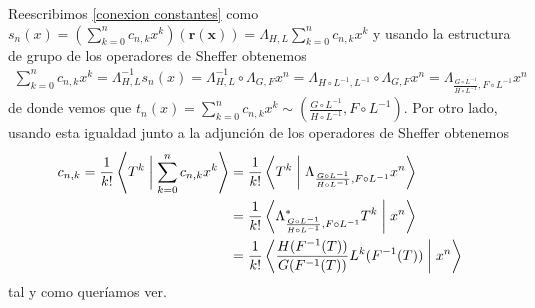 \begin{demo}
    Reescribimos \eqref{conexion constantes} como $s_n(x) = (\sum_{k=0}^n c_{n,k} x^k)(\mathbf{r(x)}) = \Lambda_{H,L}\sum_{k=0}^n c_{n,k} x^k$
    y usando la estructura de grupo de los operadores de Sheffer obtenemos
    \begin{align*}
        \sum_{k=0}^n c_{n,k}x^k = \Lambda_{H, L}^{-1}s_n(x) = \Lambda_{H, L}^{-1} \circ \Lambda_{G,F}x^n = \Lambda_{H \circ L^{-1}, L^{-1}} \circ \Lambda_{G,F}x^n = \Lambda_{\frac{G \circ L^{-1}}{H \circ L^{-1}}, F \circ L^{-1}} x^n
    \end{align*}
    de donde vemos que $t_n(x) = \sum_{k=0}^n c_{n,k}x^k \sim (\frac{G \circ L^{-1}}{H \circ L^{-1}}, F \circ L^{-1})$. Por otro lado, usando esta igualdad junto a la adjunción de los operadores de Sheffer obtenemos
    \begin{align*}
        c_{n,k} = \frac{1}{k!} \left\langle T^k \biggm| \sum_{k=0}^n c_{n,k}x^k\right\rangle & = \frac{1}{k!} \left\langle T^k \biggm| \Lambda_{\frac{G \circ L^{-1}}{H \circ L^{-1}}, F \circ L^{-1}} x^n\right\rangle \\
        & = \frac{1}{k!} \left\langle \Lambda_{\frac{G \circ L^{-1}}{H \circ L^{-1}}, F \circ L^{-1}}^* T^k \biggm| x^n \right\rangle \\
        & = \frac{1}{k!} \left\langle \frac{H(F^{-1}(T))}{G(F^{-1}(T))} L^k(F^{-1}(T)) \biggm| x^n \right\rangle
    \end{align*}
    tal y como queríamos ver. 
\end{demo}

